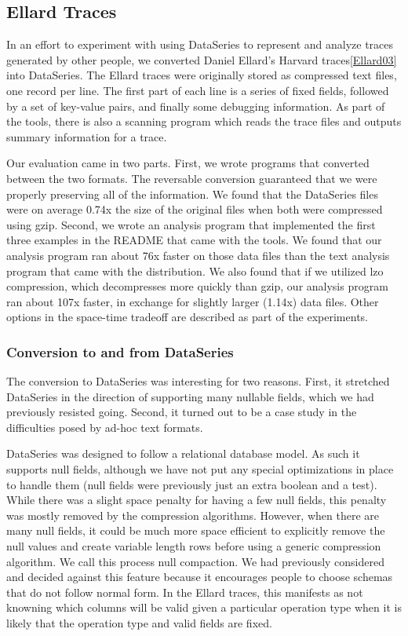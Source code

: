 \documentclass{article}
\begin{document}
\subsection{Ellard Traces}

In an effort to experiment with using DataSeries to represent and
analyze traces generated by other people, we converted Daniel Ellard's
Harvard traces\ref{Ellard03} into DataSeries.  The Ellard traces
were originally stored as compressed text files, one record per line.
The first part of each line is a series of fixed fields, followed by a
set of key-value pairs, and finally some debugging information.  As
part of the tools, there is also a scanning program which reads the
trace files and outputs summary information for a trace.

Our evaluation came in two parts.  First, we wrote programs that
converted between the two formats.  The reversable conversion
guaranteed that we were properly preserving all of the information.
We found that the DataSeries files were on average 0.74x the size of
the original files when both were compressed using gzip.  Second, we
wrote an analysis program that implemented the first three examples in
the README that came with the tools.  We found that our analysis
program ran about 76x faster on those data files than the text
analysis program that came with the distribution.  
We also found that if we utilized lzo compression, which decompresses
more quickly than gzip,
our analysis program
ran about 107x faster, in exchange for slightly larger (1.14x) data files.
Other options in the space-time
tradeoff are described as part of the experiments.

\subsubsection{Conversion to and from DataSeries}

The conversion to DataSeries was interesting for two reasons.  First,
it stretched DataSeries in the direction of supporting many nullable
fields, which we had previously resisted going.  Second, it turned out
to be a case study in the difficulties posed by ad-hoc text formats.

DataSeries was designed to follow a relational database model.  As
such it supports null fields, although we have not put any special
optimizations in place to handle them (null fields were previously
just an extra boolean and a test).  While there was a slight space
penalty for having a few null fields, this penalty was mostly removed
by the compression algorithms.  However, when there are many null
fields, it could be much more space efficient to explicitly remove the
null values and create variable length rows before using a generic
compression algorithm.  We call this process null compaction.  We had
previously considered and decided against this feature because it
encourages people to choose schemas that do not follow normal form.
In the Ellard traces, this manifests as not knowning which columns
will be valid given a particular operation type when it is likely that
the operation type and valid fields are fixed.
\end{document}
